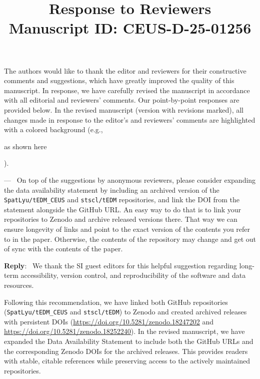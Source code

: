 \documentclass[11pt]{article}
\title{Response to Reviewers \\ Manuscript ID: CEUS-D-25-01256}
\author{}
\date{}
\newcounter{reviewer}
\newcounter{point}[reviewer]
\newenvironment{point1}
   {\refstepcounter{point} \bigskip \noindent {\textbf{Editor Comment~}} ---\ }
   {\par }
\newenvironment{reply}
   {\medskip \noindent \color{blue} \begin{sf}\textbf{Reply}:\  }
   {\medskip \par \end{sf}}
\begin{document}
\maketitle

\vspace{-30pt}

The authors would like to thank the editor and reviewers for their constructive comments and suggestions, which have greatly improved the quality of this manuscript. In response, we have carefully revised the manuscript in accordance with all editorial and reviewers’ comments. Our point-by-point responses are provided below. In the revised manuscript (version with revisions marked), all changes made in response to the editor's and reviewers' comments are highlighted with a colored background (e.g., \colorbox{revisionmodified}{\strut as shown here}).

\begin{point1}
On top of the suggestions by anonymous reviewers, please consider expanding the data availability statement by including an archived version of the \texttt{SpatLyu/tEDM\_CEUS} and \texttt{stscl/tEDM} repositories, and link the DOI from the statement alongside the GitHub URL. An easy way to do that is to link your repositories to Zenodo and archive released versions there. That way we can ensure longevity of links and point to the exact version of the contents you refer to in the paper. Otherwise, the contents of the repository may change and get out of sync with the contents of the paper.
\end{point1}

\begin{reply}
We thank the SI guest editors for this helpful suggestion regarding long-term accessibility, version control, and reproducibility of the software and data resources.

Following this recommendation, we have linked both GitHub repositories (\texttt{SpatLyu/tEDM\_CEUS} and \texttt{stscl/tEDM}) to Zenodo and created archived releases with persistent DOIs (\url{https://doi.org/10.5281/zenodo.18247202} and \url{https://doi.org/10.5281/zenodo.18252240}). In the revised manuscript, we have expanded the Data Availability Statement to include both the GitHub URLs and the corresponding Zenodo DOIs for the archived releases. This provides readers with stable, citable references while preserving access to the actively maintained repositories.
\end{reply}
\end{document}
